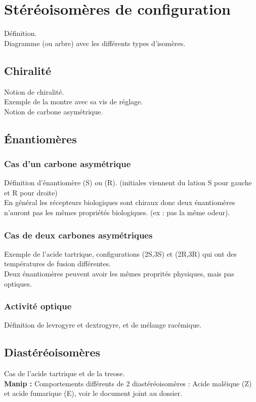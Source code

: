 \documentclass[12pt,prb,aps,epsf]{article}
\begin{document}
\section{Stéréoisomères de configuration}
Définition.\\
Diagramme (ou arbre) avec les différents types d'isomères.

\subsection{Chiralité}
Notion de chiralité.\\
Exemple de la montre avec sa vis de réglage.\\
Notion de carbone asymétrique.

\subsection{Énantiomères}
\subsubsection{Cas d'un carbone asymétrique}
Définition d'énantiomère (S) ou (R). (initiales viennent du lation S pour gauche et R pour droite)\\
En général les récepteurs biologiques sont chiraux donc deux énantiomères n'auront pas les mêmes propriétés biologiques. (ex : pas la même odeur).

\subsubsection{Cas de deux carbones asymétriques}
Exemple de l'acide tartrique, configurations (2S,3S) et (2R,3R) qui ont des températures de fusion différentes.\\
Deux énantiomères peuvent avoir les mêmes proprités physiques, mais pas optiques.

\subsubsection{Activité optique}
Définition de levrogyre et dextrogyre, et de mélange racémique.

\subsection{Diastéréoisomères}
Cas de l'acide tartrique et de la treose.\\

\textbf{Manip : } Comportements différents de 2 diastéréoisomères : Acide maléique (Z) et acide fumarique (E), voir le document joint au dossier.\\
\end{document}
